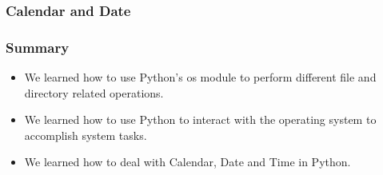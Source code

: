 \documentclass{beamer}
\begin{document}
\begin{frame}
\frametitle{Calendar and Date}
\end{frame}

\begin{frame}
\frametitle{Summary}
\begin{itemize}
\item We learned how to use Python's os module to perform different file and directory related operations.
\item We learned how to use Python to interact with the operating system to accomplish system tasks.
\item We learned how to deal with Calendar, Date and Time in Python.
\end{itemize}
\end{frame}
\end{document}
